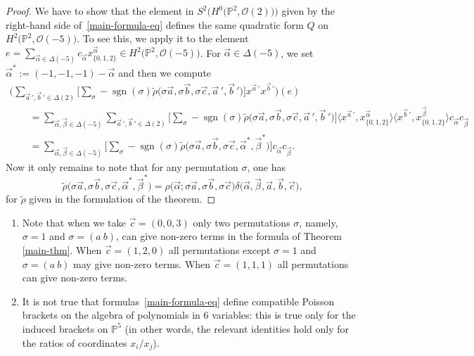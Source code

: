 \documentclass[pdftex]{sigma}
\numberwithin{equation}{section}
\renewcommand{\P}{{\mathbb P}}
\newcommand{\OO}{{\mathcal O}}
\begin{document}
\begin{proof}
 We have to show that the element in $S^2\big(H^0\big(\P^2,\OO(2)\big)\big)$ given by the right-hand side of~\eqref{main-formula-eq}
defines the same quadratic form $Q$ on $H^2\big(\P^2,\OO(-5)\big)$.
To see this, we apply it to the element $e=\sum_{\vec{\alpha}\in \Delta(-5)}c_{\vec{\alpha}}x^{\vec{\alpha}}_{\{0,1,2\}}\in H^2\big(\P^2,\OO(-5)\big)$. For $\vec{\alpha}\in \Delta(-5)$, we set $\vec{\alpha}^*:=(-1,-1,-1)-\vec{\alpha}$ and then we compute
\begin{gather*}
	\bigg(\sum_{\vec{a}\,{}',\vec{b}\,{}'\in \Delta(2)}\bigg[\sum_{\sigma}-\operatorname{sgn}(\sigma)\tilde{\rho}\big(\sigma\vec{a}, \sigma\vec{b},\sigma\vec{c},\vec{a}\,{}',\vec{b}\,{}'\big)\bigg]x^{\vec{a}\,{}'}x^{\vec{b}\,{}'}\bigg)(e)\\
\qquad{}=	\sum_{\vec{\alpha},\vec{\beta}\in \Delta(-5)}\sum_{\vec{a}\,{}',\vec{b}\,{}'\in \Delta(2)}\!\!\bigg[\sum_{\sigma}-\operatorname{sgn}(\sigma)\tilde{\rho}\big(\sigma\vec{a}, \sigma\vec{b},\sigma\vec{c},\vec{a}\,{}',\vec{b}\,{}'\big)\bigg]\langle x^{\vec{a}\,{}'},x^{\vec{\alpha}}_{\{0,1,2\}}\rangle \langle x^{\vec{b}\,{}'},x^{\vec{\beta}}_{\{0,1,2\}}\rangle c_{\vec{\alpha}}c_{\vec{\beta}}\\
\qquad{}=	\sum_{\vec{\alpha},\vec{\beta}\in \Delta(-5)}\bigg[\sum_{\sigma}-\operatorname{sgn}(\sigma)\tilde{\rho}\big(\sigma \vec{a},\sigma \vec{b},\sigma \vec{c},\vec{\alpha}^*,\vec{\beta}^*\big)\bigg]c_{\vec{\alpha}}c_{\vec{\beta}}.
\end{gather*}
Now it only remains to note that for any permutation $\sigma$, one has
\[
\tilde{\rho}\big(\sigma\vec{a}, \sigma\vec{b},\sigma\vec{c},\vec{\alpha}^*,\vec{\beta}^*\big)=\rho\big(\vec{\alpha};\sigma\vec{a}, \sigma\vec{b},\sigma\vec{c}\big)\delta\big(\vec{\alpha},\vec{\beta},\vec{a},\vec{b},\vec{c}\big),
\]
for $\tilde{\rho}$ given in the formulation of the theorem. \end{proof}

\begin{Remarks}\quad
\begin{enumerate}\itemsep=0pt
\item Note that when we take $\vec{c}=(0,0,3)$ only two permutations $\sigma$, namely, $\sigma=1$ and $\sigma=(a \ b)$, can give non-zero terms in the formula of
Theorem \ref{main-thm}. When $\vec{c}=(1,2,0)$ all permutations except $\sigma=1$ and $\sigma=(a \ b)$ may give non-zero terms. When $\vec{c}=(1,1,1)$ all permutations can give non-zero terms.

\item It is not true that formulas~\eqref{main-formula-eq} define compatible Poisson brackets on the algebra of polynomials in $6$ variables: this is true only for the induced
brackets on $\P^5$ (in other words, the relevant identities hold only for the ratios of coordinates $x_i/x_j$).
\end{enumerate}
\end{Remarks}
\end{document}

